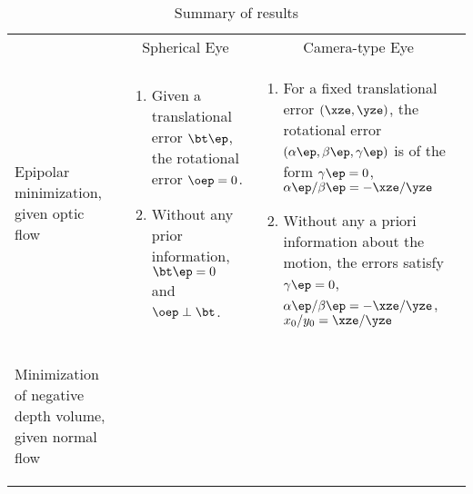 \documentclass[10pt,twocolumn]{article}
\begin{document}
\begin{table*}[htbp]
\caption{Summary of results}
\centering  
\begin{tabular}{p{5cm}p{5.5cm}p{5.5cm}}
    \multicolumn{1}{c}{}& \multicolumn{1}{c}{Spherical Eye} &
    \multicolumn{1}{c}{Camera-type Eye}\\\cline{1-3}
    \begin{description}
    \item Epipolar minimization, given optic flow
    \end{description} & 
    \begin{enumerate}\renewcommand{\labelenumi}{{\small (\alph{enumi})}}
    \item Given a translational error $\bt\ep$, the rotational error $\oep
      = 0$.
    \item Without any prior information, $\bt\ep = 0$ and $\oep \perp
      \bt$.
    \end{enumerate}
    & 
    \begin{enumerate}\renewcommand{\labelenumi}{{\small (\alph{enumi})}}
    \item For a fixed translational error $(\xze, \yze)$, the
      rotational error $(\alpha\ep, \beta\ep, \gamma\ep)$ is of the
      form $\gamma\ep = 0$, ${\alpha\ep}/{\beta\ep} = {-\xze}/{\yze}$
    \item Without any a priori information about the motion, the
      errors satisfy $\gamma\ep = 0$, ${\alpha\ep}/{\beta\ep} =
      {-\xze}/{\yze}$, ${x_0}/{y_0} = {\xze}/{\yze}$
    \end{enumerate}\\\cline{1-3}
    \begin{description}
    \item Minimization of negative depth volume, given normal flow
    \end{description} & 
    \begin{enumerate}\renewcommand{\labelenumi}{{\small (\alph{enumi})}}

\end{enumerate}
\end{tabular}
\end{table*}
\end{document}
